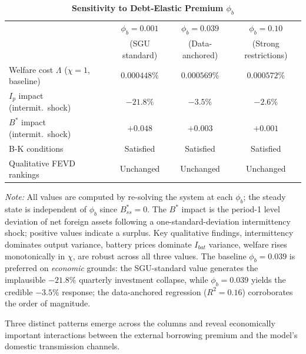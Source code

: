 \documentclass[12pt, a4paper]{article}
\begin{document}
	\begin{table}[H]
		\centering
		\caption{\textbf{Sensitivity to Debt-Elastic Premium $\phi_b$}}
		\label{tab:phi_b_sensitivity}
		\renewcommand{\arraystretch}{1.3}
		\footnotesize
		\begin{tabular}{l c c c}
			\toprule
			& $\phi_b = 0.001$ & $\phi_b = 0.039$ & $\phi_b = 0.10$ \\
			& (SGU standard) & (Data-anchored) & (Strong restrictions) \\
			\midrule
			Welfare cost $\Lambda$ ($\chi=1$, baseline) & $0.000448\%$ & $0.000569\%$ & $0.000572\%$ \\
			$I_p$ impact (intermit.\ shock) & $-21.8\%$ & $-3.5\%$ & $-2.6\%$ \\
			$B^*$ impact (intermit.\ shock) & $+0.048$ & $+0.003$ & $+0.001$ \\
			B-K conditions & Satisfied & Satisfied & Satisfied \\
			Qualitative FEVD rankings & Unchanged & Unchanged & Unchanged \\
			\bottomrule
		\end{tabular}
		\vspace{0.2cm}
		\parbox{\linewidth}{\footnotesize \textit{Note:} All values are computed by re-solving the system at each $\phi_b$; the steady state is independent of $\phi_b$ since $B^*_{ss}=0$. The $B^*$ impact is the period-1 level deviation of net foreign assets following a one-standard-deviation intermittency shock; positive values indicate a surplus. Key qualitative findings, intermittency dominates output variance, battery prices dominate $I_{bat}$ variance, welfare rises monotonically in $\chi$, are robust across all three values. The baseline $\phi_b = 0.039$ is preferred on \textit{economic} grounds: the SGU-standard value generates the implausible $-21.8\%$ quarterly investment collapse, while $\phi_b = 0.039$ yields the credible $-3.5\%$ response; the data-anchored regression ($R^2 = 0.16$) corroborates the order of magnitude.}
	\end{table}
	
	Three distinct patterns emerge across the columns and reveal economically important interactions between the external borrowing premium and the model's domestic transmission channels.
\end{document}
